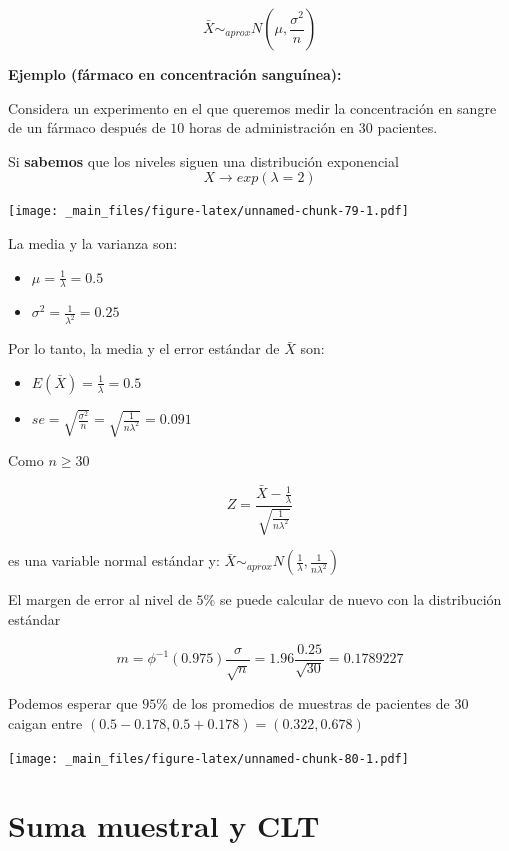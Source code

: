 \documentclass[
]{book}
\providecommand{\tightlist}{%
  \setlength{\itemsep}{0pt}\setlength{\parskip}{0pt}}
\begin{document}
\[\bar{X} \sim_{aprox} N(\mu, \frac{\sigma^2}{n})\]

\textbf{Ejemplo (fármaco en concentración sanguínea):}

Considera un experimento en el que queremos medir la concentración en sangre de un fármaco después de \(10\) horas de administración en \(30\) pacientes.

Si \textbf{sabemos} que los niveles siguen una distribución exponencial \[X \rightarrow exp(\lambda=2)\]

\texttt{[image: \_main\_files/figure-latex/unnamed-chunk-79-1.pdf]}

La media y la varianza son:

\begin{itemize}
\tightlist
\item
  \(\mu=\frac{1}{\lambda}=0.5\)
\item
  \(\sigma^2=\frac{1}{\lambda^2}=0.25\)
\end{itemize}

Por lo tanto, la media y el error estándar de \(\bar{X}\) son:

\begin{itemize}
\tightlist
\item
  \(E(\bar{X})=\frac{1}{\lambda}=0.5\)
\item
  \(se=\sqrt{\frac{\sigma^2}{n}}=\sqrt{\frac{1}{n\lambda^2}}=0.091\)
\end{itemize}

Como \(n \geq 30\)

\[Z=\frac{\bar{X}-\frac{1}{\lambda}}{\sqrt{\frac{1}{n\lambda^2}}}\]

es una variable normal estándar y: \(\bar{X} \sim_{aprox} N(\frac{1}{\lambda}, \frac{1}{n\lambda^2})\)

El margen de error al nivel de \(5\%\) se puede calcular de nuevo con la distribución estándar

\[m=\phi^{-1}(0.975) \frac{\sigma}{\sqrt{n}}=1.96\frac{0.25}{\sqrt{30}}=0.1789227\]

Podemos esperar que \(95\%\) de los promedios de muestras de pacientes de \(30\) caigan entre
\((0.5-0.178, 0.5+0.178)= (0.322, 0.678)\)

\texttt{[image: \_main\_files/figure-latex/unnamed-chunk-80-1.pdf]}

\hypertarget{suma-muestral-y-clt}{%
\section{Suma muestral y CLT}\label{suma-muestral-y-clt}}
\end{document}
